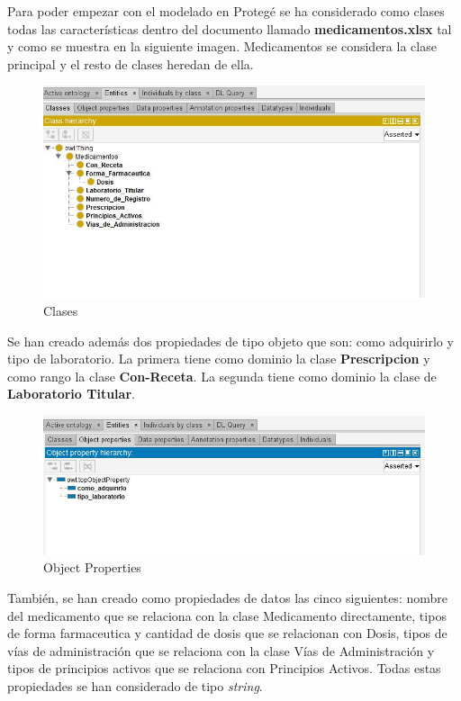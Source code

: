 \documentclass[../main.tex]{subfiles}
\begin{document}
Para poder empezar con el modelado en Protegé se ha considerado como clases todas las características dentro del documento llamado \textbf{medicamentos.xlsx } tal y como se muestra en la siguiente imagen. Medicamentos se considera la clase principal y el resto de clases heredan de ella.\\

\begin{figure}[h]
    \centering
    \includegraphics[scale=0.7]{images/protege-Classes.jpeg}
    \caption{Clases}
    \label{fig:mesh1}
\end{figure}


\vspace{2cm}
Se han creado además dos propiedades de tipo objeto que son: como adquirirlo y tipo de laboratorio. La primera tiene como dominio la clase \textbf{Prescripcion} y como rango la clase \textbf{Con-Receta}. La segunda tiene como dominio la clase de \textbf{Laboratorio Titular}.\\

\begin{figure}[h]
    \centering
    \includegraphics[scale=0.7]{images/protege-ObjectProperties.jpeg}
    \caption{Object Properties}
    \label{fig:mesh1}
\end{figure}

\vspace{1cm}
También, se han creado como propiedades de datos las cinco siguientes: nombre del medicamento que se relaciona con la clase Medicamento directamente, tipos de forma farmaceutica y cantidad de dosis que se relacionan con Dosis, tipos de vías de administración que se relaciona con la clase Vías de Administración y tipos de principios activos que se relaciona con Principios Activos. Todas estas propiedades se han considerado de tipo \textit{string}. \\
\end{document}
